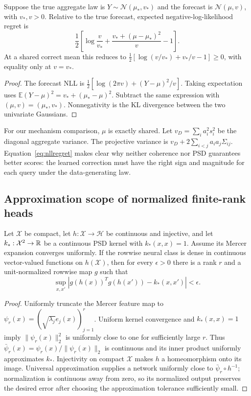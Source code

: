 \begin{proposition}\label{prop:nll}
Suppose the true aggregate law is $Y\sim\mathcal N(\mu_*,v_*)$ and the
forecast is $\mathcal N(\mu,v)$, with $v_*,v>0$.  Relative to the true
forecast, expected negative-log-likelihood regret is
\begin{equation}
 \frac12\left[\log\frac{v}{v_*}
 +\frac{v_*+(\mu-\mu_*)^2}{v}-1\right].                         \label{eq:nllregret}
\end{equation}
At a shared correct mean this reduces to
$\frac12[\log(v/v_*)+v_*/v-1]\geq0$, with equality only at $v=v_*$.
\end{proposition}
\begin{proof}
The forecast NLL is
$\tfrac12[\log(2\pi v)+(Y-\mu)^2/v]$.  Taking expectation uses
$\mathbb E(Y-\mu)^2=v_*+(\mu_* -\mu)^2$.  Subtract the same expression with
$(\mu,v)=(\mu_*,v_*)$.  Nonnegativity is the KL divergence between the two
univariate Gaussians.
\end{proof}

For our mechanism comparison, $\mu$ is exactly shared.  Let
$v_D=\sum_i a_i^2s_i^2$ be the diagonal aggregate variance.  The projective
variance is
$v_D+2\sum_{i<j}a_ia_j\Sigma_{ij}$.  Equation~\eqref{eq:nllregret} makes clear
why neither coherence nor PSD guarantees better scores: the learned correction
must have the right sign and magnitude for each query under the data-generating
law.

\subsection{Approximation scope of normalized finite-rank heads}

\begin{proposition}
Let $\mathcal X$ be compact, let $h:\mathcal X\to\mathcal H$ be continuous
and injective, and let $k_*:\mathcal X^2\to\mathbb{R}$ be a continuous PSD kernel
with $k_*(x,x)=1$.  Assume its Mercer expansion converges uniformly.  If the
rowwise neural class is dense in continuous vector-valued functions on
$h(\mathcal X)$, then for every $\epsilon>0$ there is a rank $r$ and a
unit-normalized rowwise map $g$ such that
\begin{equation}
 \sup_{x,x'}|g(h(x))^Tg(h(x'))-k_*(x,x')|<\epsilon.
\end{equation}
\end{proposition}
\begin{proof}
Uniformly truncate the Mercer feature map to
$\psi_r(x)=(\sqrt{\lambda_j}e_j(x))_{j=1}^r$.  Uniform kernel convergence and
$k_*(x,x)=1$ imply $\|\psi_r(x)\|_2^2$ is uniformly close to one for
sufficiently large $r$.  Thus
$\bar\psi_r(x)=\psi_r(x)/\|\psi_r(x)\|_2$ is continuous and its inner product
uniformly approximates $k_*$.  Injectivity on compact $\mathcal X$ makes
$h$ a homeomorphism onto its image.  Universal approximation supplies a
network uniformly close to $\bar\psi_r\circ h^{-1}$; normalization is
continuous away from zero, so its normalized output preserves the desired
error after choosing the approximation tolerance sufficiently small.
\end{proof}

